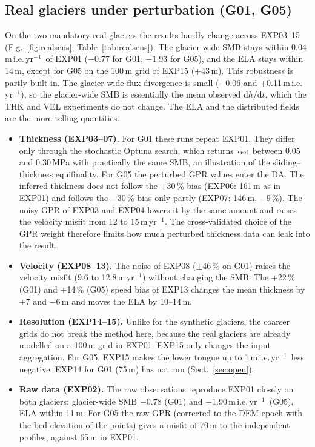 \documentclass[10pt,a4paper]{article}
\newcommand{\myr}{m\,yr$^{-1}$}
\newcommand{\mie}{m\,i.e.\,yr$^{-1}$}
\begin{document}
\subsection{Real glaciers under perturbation (G01, G05)}\label{sec:realsens}
On the two mandatory real glaciers the results hardly change across EXP03--15 (Fig.~\ref{fig:realsens},
Table~\ref{tab:realsens}). The glacier-wide SMB stays within 0.04\,\mie\ of EXP01 ($-0.77$ for G01, $-1.93$ for G05), and the
ELA stays within 14\,m, except for G05 on the 100\,m grid of EXP15 (+43\,m). This robustness is partly built in.
The glacier-wide flux divergence is small ($-0.06$ and +0.11\,\mie), so the glacier-wide SMB is essentially the mean observed d$h$/d$t$,
which the THK and VEL experiments do not change. The ELA and the distributed fields are the more telling quantities.
\begin{itemize}\setlength{\itemsep}{1pt}
\item \textbf{Thickness (EXP03--07).} For G01 these runs repeat EXP01. They differ only through the stochastic Optuna search, which returns
$\tau_{\rm ref}$ between 0.05 and 0.30\,MPa with practically the same SMB, an illustration of the sliding--thickness
equifinality. For G05 the perturbed GPR values enter the DA. The inferred thickness does not follow the +30\,\% bias
(EXP06: 161\,m as in EXP01) and follows the $-30$\,\% bias only partly (EXP07: 146\,m, $-9$\,\%). The noisy GPR of EXP03 and EXP04
lowers it by the same amount and raises the velocity misfit from 12 to 15\,\myr. The cross-validated choice of the GPR
weight therefore limits how much perturbed thickness data can leak into the result.
\item \textbf{Velocity (EXP08--13).} The noise of EXP08 ($\pm$46\,\% on G01) raises the velocity misfit (9.6 to 12.8\,\myr)
without changing the SMB. The +22\,\% (G01) and +14\,\% (G05) speed bias of EXP13 changes the mean thickness by +7 and $-6$\,m
and moves the ELA by 10--14\,m.
\item \textbf{Resolution (EXP14--15).} Unlike for the synthetic glaciers, the coarser grids do not break the method here,
because the real glaciers are already modelled on a 100\,m grid in EXP01: EXP15 only changes the input aggregation.
For G05, EXP15 makes the lower tongue up to 1\,\mie\ less negative. EXP14 for G01 (75\,m) has not run (Sect.~\ref{sec:open}).
\item \textbf{Raw data (EXP02).} The raw observations reproduce EXP01 closely on both glaciers: glacier-wide SMB $-0.78$
(G01) and $-1.90$\,\mie\ (G05), ELA within 11\,m. For G05 the raw GPR (corrected to the DEM epoch with the bed
elevation of the points) gives a misfit of 70\,m to the independent profiles, against 65\,m in EXP01.
\end{itemize}
\end{document}
